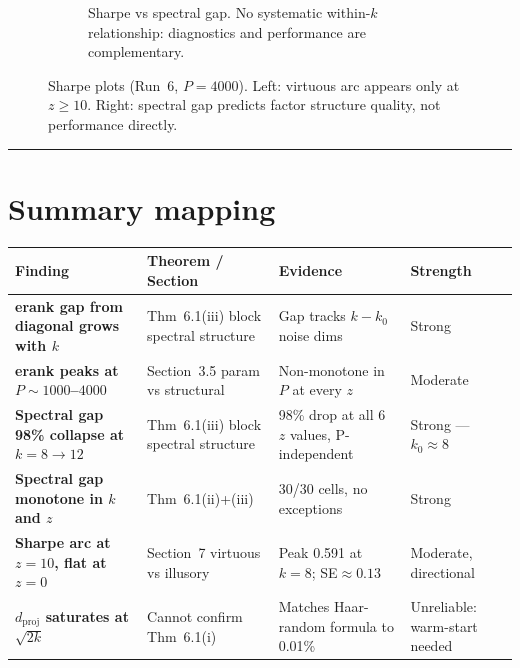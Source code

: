 \documentclass[11pt,a4paper]{article}
\begin{document}
\begin{figure}[h]
\begin{subfigure}[b]{0.48\textwidth}
\caption{Sharpe vs spectral gap. No systematic within-$k$ relationship:
diagnostics and performance are complementary.}
\end{subfigure}
\caption{Sharpe plots (Run~6, $P=4000$). Left: virtuous arc appears only at $z\geq10$.
Right: spectral gap predicts factor structure quality, not performance directly.}
\end{figure}

\noindent\rule{\textwidth}{0.4pt}

\section*{Summary mapping}

\renewcommand{\arraystretch}{1.25}
\begin{tabular}{>{\bfseries\small}p{3.2cm} p{3.8cm} p{4.0cm} p{2.6cm}}
\rowcolor{headbg}\color{headfg} Finding &
\color{headfg} Theorem / Section &
\color{headfg} Evidence &
\color{headfg} Strength \\
\hline
erank gap from diagonal grows with $k$ &
Thm~6.1(iii) block spectral structure &
Gap tracks $k-k_0$ noise dims &
\textcolor{cblue}{Strong} \\
\rowcolor{rowalt}
erank peaks at $P\sim1000$--$4000$ &
Section~3.5 param vs structural &
Non-monotone in $P$ at every $z$ &
\textcolor{camber}{Moderate} \\
Spectral gap 98\% collapse at $k=8{\to}12$ &
Thm~6.1(iii) block spectral structure &
98\% drop at all 6 $z$ values, P-independent &
\textcolor{cblue}{Strong --- $k_0\approx8$} \\
\rowcolor{rowalt}
Spectral gap monotone in $k$ and $z$ &
Thm~6.1(ii)+(iii) &
30/30 cells, no exceptions &
\textcolor{cblue}{Strong} \\
Sharpe arc at $z=10$, flat at $z=0$ &
Section~7 virtuous vs illusory &
Peak 0.591 at $k=8$; SE$\approx0.13$ &
\textcolor{camber}{Moderate, directional} \\
\rowcolor{rowalt}
$d_{\mathrm{proj}}$ saturates at $\sqrt{2k}$ &
Cannot confirm Thm~6.1(i) &
Matches Haar-random formula to 0.01\% &
\textcolor{cred}{Unreliable: warm-start needed} \\
\end{tabular}
\end{document}

